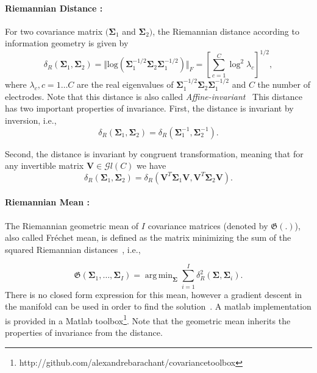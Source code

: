 \documentclass[11pt,a4paper]{article}
\newcommand{\argmin}{\mathop{\mathrm{arg\,min}}}
\begin{document}
\paragraph{Riemannian Distance :}
For two covariance matrix $(\mathbf{\Sigma}_1$ and $\mathbf{\Sigma}_2) $, the Riemannian distance according to information geometry is given by~\cite{r}
\begin{equation}
\label{eq:Rgeodistance}
\delta_R(\mathbf{\Sigma}_1,\mathbf{\Sigma}_2) 
= 
\Vert \mathrm{log} \left( \mathbf{\Sigma}_1^{-1/2} \mathbf{\Sigma}_2 \mathbf{\Sigma}_1^{-1/2} \right) \Vert_F
=
\left[ \sum_{c=1}^{C} \log^2 \lambda_c \right]^{1/2},
\end{equation}
where $\lambda_c, c=1\ldots C$ are the real eigenvalues 
of $\mathbf{\Sigma}_1^{-1/2} \mathbf{\Sigma}_2 \mathbf{\Sigma}_1^{-1/2}$ and $C$ the number of electrodes.
 Note that this distance is also called \emph{Affine-invariant}~\cite{arsigny2007geometric}
This distance has two important properties of invariance. First, the distance is invariant by inversion, i.e., 
\begin{equation}
\label{eq:invariance1}
\delta_R(\mathbf{\Sigma}_1,\mathbf{\Sigma}_2) = \delta_R(\mathbf{\Sigma}^{-1}_1,\mathbf{\Sigma}^{-1}_2).
\end{equation}

Second, the distance is invariant by congruent transformation, meaning that for any invertible matrix $\mathbf{V} \in \mathcal{G}l(C)$ we have
\begin{equation}
\label{eq:invariance2}
\delta_R(\mathbf{\Sigma}_1,\mathbf{\Sigma}_2) = \delta_R(\mathbf{V}^T\mathbf{\Sigma}_1\mathbf{V},\mathbf{V}^T\mathbf{\Sigma}_2\mathbf{V}).
\end{equation}
\paragraph{Riemannian Mean :}
The Riemannian geometric mean of $I$ covariance matrices (denoted by $\mathfrak{G}(.)$), also called Fr\'echet mean, is defined as the matrix minimizing the sum of the squared Riemannian distances~\cite{pennec2006riemannian}, i.e.,

\begin{equation}
\mathfrak{G} \left( \mathbf{\Sigma}_1,\ldots,\mathbf{\Sigma}_I \right) = \argmin_{\mathbf{\Sigma}} 
\sum_{i=1}^{I} 
\delta_R^2 \left( \mathbf{\Sigma},\mathbf{\Sigma}_i \right).
\label{eq:geo_mean}
\end{equation}
There is no closed form expression for this mean, however a gradient descent in the manifold can be used in order to find the solution~\cite{pennec2006riemannian}. A matlab implementation is provided in a Matlab toolbox\footnote{http://github.com/alexandrebarachant/covariancetoolbox}.
Note that the geometric mean inherits the properties of invariance from the distance.
\end{document}
